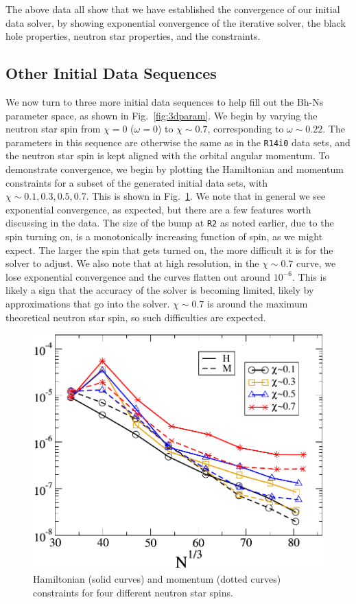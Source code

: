 The above data all show that we have established the convergence of
our initial data solver, by showing exponential convergence of the
iterative solver, the black hole properties, neutron star properties,
and the constraints.

\subsection{Other Initial Data Sequences}
We now turn to three more initial data sequences to help fill out the
Bh-Ns parameter space, as shown in Fig.~\ref{fig:3dparam}. We begin by
varying the neutron star spin from $\chi=0$ ($\omega=0$) to $\chi\sim0.7$,
corresponding to $\omega\sim0.22$. The parameters in this
sequence are otherwise the same as in the {\tt R14i0} data sets, and the neutron star spin is kept aligned with the orbital
angular momentum. To demonstrate convergence, we begin by plotting the
Hamiltonian and momentum constraints for a subset of the generated
initial data sets, with $\chi\sim{0.1,0.3,0.5,0.7}$. This is shown in
Fig.~\ref{fig:OmegaSeqHamMom}. We note that in general we see
exponential convergence, as expected, but there are a few features
worth discussing in the data. The size of the bump at {\tt R2} as noted
earlier, due to the spin turning on, is a monotonically increasing function of spin, as we might
expect. The larger the spin that gets turned on, the more difficult it
is for the solver to adjust. We also note that at high resolution, in
the $\chi\sim 0.7$ curve, we lose exponential convergence and the
curves flatten out around $10^{-6}$.  This is likely a sign that the accuracy of the
solver is becoming limited, likely by approximations that go into the
solver. $\chi\sim 0.7$ is around the maximum theoretical neutron star
spin, so such difficulties are expected.

\begin{figure}
\includegraphics[width=0.95\columnwidth]{chap4/OmegaSeqHamMom}
\caption[Constraints for the $\chi_{\rm NS}$ sequence.]{\label{fig:OmegaSeqHamMom} Hamiltonian (solid curves) and
momentum (dotted curves) constraints for four different neutron star spins.}
\end{figure}

